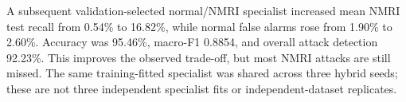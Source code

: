 A subsequent validation-selected normal/NMRI specialist increased mean NMRI test recall from 0.54\% to 16.82\%, while normal false alarms rose from 1.90\% to 2.60\%. Accuracy was 95.46\%, macro-F1 0.8854, and overall attack detection 92.23\%. This improves the observed trade-off, but most NMRI attacks are still missed. The same training-fitted specialist was shared across three hybrid seeds; these are not three independent specialist fits or independent-dataset replicates.
